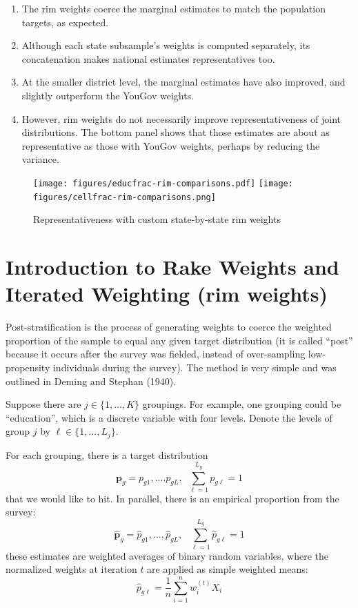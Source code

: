 \documentclass[11pt]{article}
\begin{document}
\medskip
\begin{enumerate}
\item The rim weights coerce the marginal estimates to match the population targets, as expected.
\item Although each state subsample's weights is computed separately, its concatenation makes national estimates representatives too. 
\item At the smaller district level, the marginal estimates have also improved, and slightly outperform the YouGov weights.
\item However, rim weights do not necessarily improve representativeness of joint distributions. The bottom panel shows that those estimates are about as representative as those with YouGov weights, perhaps by reducing the variance.
\end{enumerate}

\FloatBarrier

\begin{figure}[!htbp]
\centering
\caption{Representativeness with custom state-by-state rim weights \label{fig:rim-comparisons}}
\texttt{[image: figures/educfrac-rim-comparisons.pdf]}
\texttt{[image: figures/cellfrac-rim-comparisons.png]}
\end{figure}

\FloatBarrier

\pagebreak


\appendix

\section{Introduction to Rake Weights and Iterated Weighting (rim weights)}

Post-stratification is the process of generating weights to coerce the weighted proportion of the sample to equal any given target distribution (it is called ``post'' because it occurs after the survey was fielded, instead of over-sampling low-propensity individuals during the survey). The method is very simple and was outlined in Deming and Stephan (1940). 

Suppose there are \(j \in \{1, ..., K\}\) groupings. For example, one grouping could be ``education'', which is a discrete variable with four levels. Denote the levels of group \(j\) by \(\ell \in \{1, ..., L_j\}\). 

For each grouping, there is a target distribution \[\mathbf{p}_g = p_{g1}, .... p_{gL}, ~~ \sum^{L_{g}}_{\ell = 1}p_{g\ell} = 1\] that we would like to hit. In parallel, there is an empirical proportion from the survey: \[\widehat{\mathbf{p}}_g = \widehat{p}_{g1},  ..., \widehat{p}_{gL}, ~~~\sum^{L_{g}}_{\ell = 1}\hat{p}_{g\ell} = 1\]
these estimates are weighted averages of binary random variables, where the normalized weights at iteration \(t\) are applied as simple weighted means:
\[\widehat{p}_{g\ell} = \frac{1}{n}\sum^n_{i=1}w_i^{(t)} X_i\]
\end{document}
